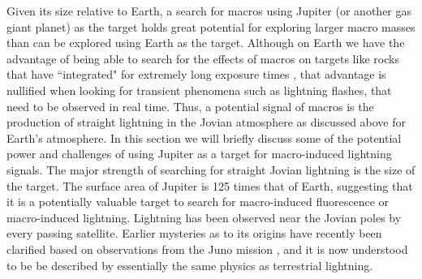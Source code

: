 \documentclass[%
 reprint,
 amsmath,amssymb,
 aps,
]{revtex4-2}
\newcommand{\vtwo}[1]{{\color{red} #1}}
\begin{document}
    Given its size relative to Earth, a search for macros using Jupiter (or another gas giant planet) as the target holds great potential for exploring larger macro masses than can be explored using Earth as the target. \vtwo{Although on Earth we have the advantage of being able to search for the effects of macros on targets like rocks that have ``integrated" for extremely long exposure times \vtwo{\citep{Sidhu2019granite}}, that advantage is nullified when looking for transient phenomena such as lightning flashes, that need to be observed in real time. Thus, a potential signal of macros is the production of straight lightning in the Jovian atmosphere as discussed above for Earth's atmosphere. In this section we will briefly discuss some of the potential power and challenges of using Jupiter as a target for macro-induced lightning signals. The major strength of searching for straight Jovian lightning is the size of the target. The surface area of Jupiter is 125 times that of Earth, suggesting that it is a potentially valuable target to search for macro-induced fluorescence or macro-induced lightning. Lightning has been observed near the Jovian poles by every passing satellite. Earlier mysteries as to its origins have recently been clarified based on observations from the Juno mission \vtwo{\citep{Brown2018}}, and it is now understood to be be described by essentially the same physics as terrestrial lightning.}
\end{document}
